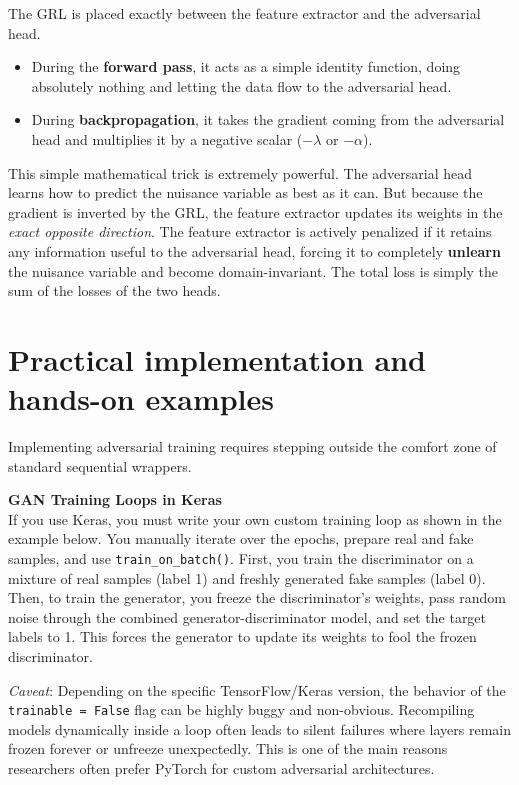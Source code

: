 The GRL is placed exactly between the feature extractor and the adversarial head. 
\begin{itemize}
    \item[-] During the \textbf{forward pass}, it acts as a simple identity function, doing absolutely nothing and letting the data flow to the adversarial head.
    \item[-] During \textbf{backpropagation}, it takes the gradient coming from the adversarial head and multiplies it by a negative scalar ($-\lambda$ or $-\alpha$).
\end{itemize}

This simple mathematical trick is extremely powerful. The adversarial head learns how to predict the nuisance variable as best as it can. But because the gradient is inverted by the GRL, the feature extractor updates its weights in the \textit{exact opposite direction}. The feature extractor is actively penalized if it retains any information useful to the adversarial head, forcing it to completely \textbf{unlearn} the nuisance variable and become domain-invariant. The total loss is simply the sum of the losses of the two heads.

\section{Practical implementation and hands-on examples}

Implementing adversarial training requires stepping outside the comfort zone of standard sequential wrappers. 

\textbf{GAN Training Loops in Keras} \\
If you use Keras, you must write your own custom training loop as shown in the example below. You manually iterate over the epochs, prepare real and fake samples, and use \texttt{train\_on\_batch()}. 
First, you train the discriminator on a mixture of real samples (label 1) and freshly generated fake samples (label 0). Then, to train the generator, you freeze the discriminator's weights, pass random noise through the combined generator-discriminator model, and set the target labels to 1. This forces the generator to update its weights to fool the frozen discriminator. 



\textit{Caveat}: Depending on the specific TensorFlow/Keras version, the behavior of the \texttt{trainable = False} flag can be highly buggy and non-obvious. Recompiling models dynamically inside a loop often leads to silent failures where layers remain frozen forever or unfreeze unexpectedly. This is one of the main reasons researchers often prefer PyTorch for custom adversarial architectures.

